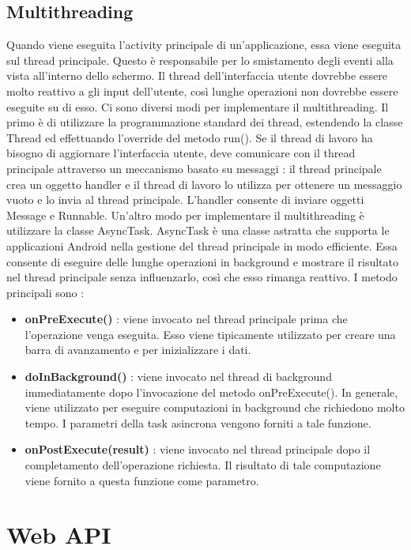 \documentclass[12pt]{report}
\begin{document}
\section{Multithreading}
Quando viene eseguita l'activity principale di un'applicazione, essa viene eseguita sul thread principale. Questo è responsabile per lo smistamento degli eventi alla vista all'interno dello schermo. Il thread dell'interfaccia utente dovrebbe essere molto reattivo a gli input dell'utente, così lunghe operazioni non dovrebbe essere eseguite su di esso. Ci sono diversi modi per implementare il multithreading. Il primo è di utilizzare la programmazione standard dei thread, estendendo la classe Thread ed effettuando l'override del metodo run(). Se il thread di lavoro ha bisogno di aggiornare l'interfaccia utente, deve comunicare con il thread principale attraverso un meccanismo basato su messaggi : il thread principale crea un oggetto handler e il thread di lavoro lo utilizza per ottenere un messaggio vuoto e lo invia al thread principale. L'handler consente di inviare oggetti Message e Runnable. Un'altro modo per implementare il multithreading è utilizzare la classe AsyncTask. AsyncTask è una classe astratta che supporta le applicazioni Android nella gestione del thread principale in modo efficiente. Essa consente di eseguire delle lunghe operazioni in background e mostrare il risultato nel thread principale senza influenzarlo, così che esso rimanga reattivo. I metodo principali sono :
\begin{itemize}
\item \textbf{onPreExecute()} : viene invocato nel thread principale prima che l'operazione venga eseguita. Esso viene tipicamente utilizzato per creare una barra di avanzamento e per inizializzare i dati.
\item \textbf{doInBackground()} : viene invocato nel thread di background immediatamente dopo l'invocazione del metodo onPreExecute(). In generale, viene utilizzato per eseguire computazioni in background che richiedono molto tempo. I parametri della task asincrona vengono forniti a tale funzione.
\item \textbf{onPostExecute(result)} : viene invocato nel thread principale dopo il completamento dell'operazione richiesta. Il risultato di tale computazione viene fornito a questa funzione come parametro.
\end{itemize}
\chapter{Web API}
\end{document}
